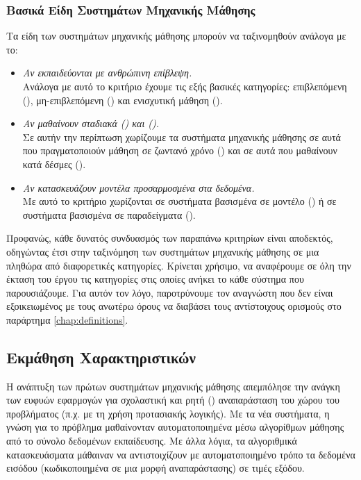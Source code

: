 \subsubsection{Βασικά Είδη Συστημάτων Μηχανικής Μάθησης}
\label{sec:_ML_varieties}
Τα είδη των συστημάτων μηχανικής μάθησης μπορούν να ταξινομηθούν ανάλογα με το:
\begin{itemize}
    \item \emph{Αν εκπαιδεύονται με ανθρώπινη επίβλεψη.}\\
    Ανάλογα με αυτό το κριτήριο έχουμε τις εξής βασικές κατηγορίες: επιβλεπόμενη (), μη-επιβλεπόμενη () και ενισχυτική μάθηση ().
    \item \emph{Αν μαθαίνουν σταδιακά () και  ().}\\
    Σε αυτήν την περίπτωση χωρίζουμε τα συστήματα μηχανικής μάθησης σε αυτά που πραγματοποιούν μάθηση σε ζωντανό χρόνο () και σε αυτά που μαθαίνουν κατά δέσμες ().
    \item \emph{Αν κατασκευάζουν μοντέλα προσαρμοσμένα στα δεδομένα.}\\ 
    Με αυτό το κριτήριο χωρίζονται σε συστήματα βασισμένα σε μοντέλο () ή σε συστήματα βασισμένα σε παραδείγματα (). \cite{geron2019hands}
\end{itemize}

Προφανώς, κάθε δυνατός συνδυασμός των παραπάνω κριτηρίων είναι αποδεκτός, οδηγώντας έτσι στην ταξινόμηση των συστημάτων μηχανικής μάθησης σε μια πληθώρα από διαφορετικές κατηγορίες. Κρίνεται χρήσιμο, να αναφέρουμε σε όλη την έκταση του έργου τις κατηγορίες στις οποίες ανήκει το κάθε σύστημα που παρουσιάζουμε. Για αυτόν τον λόγο, παροτρύνουμε τον αναγνώστη που δεν είναι εξοικειωμένος με τους ανωτέρω όρους να διαβάσει τους αντίστοιχους ορισμούς στο παράρτημα \ref{chap:definitions}. 

\subsection{Εκμάθηση Χαρακτηριστικών}
\label{sec:_feature_extraction}
Η ανάπτυξη των πρώτων συστημάτων μηχανικής μάθησης απεμπόλησε την ανάγκη των ευφυών εφαρμογών για σχολαστική και ρητή () αναπαράσταση του χώρου του προβλήματος (π.χ. με τη χρήση προτασιακής λογικής). Με τα νέα συστήματα, η γνώση για το πρόβλημα μαθαίνονταν αυτοματοποιημένα μέσω αλγορίθμων μάθησης από το σύνολο δεδομένων εκπαίδευσης. Με άλλα λόγια, τα αλγοριθμικά κατασκευάσματα μάθαιναν να αντιστοιχίζουν με αυτοματοποιημένο τρόπο τα δεδομένα εισόδου (κωδικοποιημένα σε μια μορφή αναπαράστασης) σε τιμές εξόδου. \par

